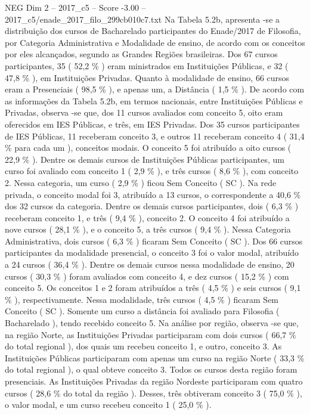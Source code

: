 \begin{textsample}{NEG Dim 2 – 2017\_c5 – Score -3.00 – 2017\_c5/enade\_2017\_filo\_299cb010c7.txt}
Na Tabela 5.2b, apresenta -se a distribuição dos cursos de Bacharelado participantes do Enade/2017 de Filosofia, por Categoria Administrativa e Modalidade de ensino, de acordo com os conceitos por eles alcançados, segundo as Grandes Regiões brasileiras.
Dos 67 cursos participantes, 35 ( 52,2 \% ) eram ministrados em Instituições Públicas, e 32 ( 47,8 \% ), em Instituições Privadas.
Quanto à modalidade de ensino, 66 cursos eram a Presenciais ( 98,5 \% ), e apenas um, a Distância ( 1,5 \% ).
De acordo com as informações da Tabela 5.2b, em termos nacionais, entre Instituições Públicas e Privadas, observa -se que, dos 11 cursos avaliados com conceito 5, oito eram oferecidos em IES Públicas, e três, em IES Privadas.
Dos 35 cursos participantes de IES Públicas, 11 receberam conceito 3, e outros 11 receberam conceito 4 ( 31,4 \% para cada um ), conceitos modais.
O conceito 5 foi atribuído a oito cursos ( 22,9 \% ).
Dentre os demais cursos de Instituições Públicas participantes, um curso foi avaliado com conceito 1 ( 2,9 \% ), e três cursos ( 8,6 \% ), com conceito 2.
Nessa categoria, um curso ( 2,9 \% ) ficou Sem Conceito ( SC ).
Na rede privada, o conceito modal foi 3, atribuído a 13 cursos, o correspondente a 40,6 \% dos 32 cursos da categoria.
Dentre os demais cursos participantes, dois ( 6,3 \% ) receberam conceito 1, e três ( 9,4 \% ), conceito 2.
O conceito 4 foi atribuído a nove cursos ( 28,1 \% ), e o conceito 5, a três cursos ( 9,4 \% ).
Nessa Categoria Administrativa, dois cursos ( 6,3 \% ) ficaram Sem Conceito ( SC ).
Dos 66 cursos participantes da modalidade presencial, o conceito 3 foi o valor modal, atribuído a 24 cursos ( 36,4 \% ).
Dentre os demais cursos nessa modalidade de ensino, 20 cursos ( 30,3 \% ) foram avaliados com conceito 4, e dez cursos ( 15,2 \% ) com conceito 5.
Os conceitos 1 e 2 foram atribuídos a três ( 4,5 \% ) e seis cursos ( 9,1 \% ), respectivamente.
Nessa modalidade, três cursos ( 4,5 \% ) ficaram Sem Conceito ( SC ).
Somente um curso a distância foi avaliado para Filosofia ( Bacharelado ), tendo recebido conceito 5.
Na análise por região, observa -se que, na região Norte, as Instituições Privadas participaram com dois cursos ( 66,7 \% do total regional ), dos quais um recebeu conceito 1, e outro, conceito 3.
As Instituições Públicas participaram com apenas um curso na região Norte ( 33,3 \% do total regional ), o qual obteve conceito 3.
Todos os cursos desta região foram presenciais.
As Instituições Privadas da região Nordeste participaram com quatro cursos ( 28,6 \% do total da região ).
Desses, três obtiveram conceito 3 ( 75,0 \% ), o valor modal, e um curso recebeu conceito 1 ( 25,0 \% ).

\end{textsample}
